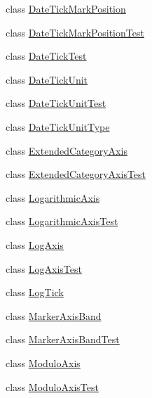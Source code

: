 \begin{DoxyCompactItemize}
\item 
class \mbox{\hyperlink{classorg_1_1jfree_1_1chart_1_1axis_1_1_date_tick_mark_position}{Date\+Tick\+Mark\+Position}}
\item 
class \mbox{\hyperlink{classorg_1_1jfree_1_1chart_1_1axis_1_1_date_tick_mark_position_test}{Date\+Tick\+Mark\+Position\+Test}}
\item 
class \mbox{\hyperlink{classorg_1_1jfree_1_1chart_1_1axis_1_1_date_tick_test}{Date\+Tick\+Test}}
\item 
class \mbox{\hyperlink{classorg_1_1jfree_1_1chart_1_1axis_1_1_date_tick_unit}{Date\+Tick\+Unit}}
\item 
class \mbox{\hyperlink{classorg_1_1jfree_1_1chart_1_1axis_1_1_date_tick_unit_test}{Date\+Tick\+Unit\+Test}}
\item 
class \mbox{\hyperlink{classorg_1_1jfree_1_1chart_1_1axis_1_1_date_tick_unit_type}{Date\+Tick\+Unit\+Type}}
\item 
class \mbox{\hyperlink{classorg_1_1jfree_1_1chart_1_1axis_1_1_extended_category_axis}{Extended\+Category\+Axis}}
\item 
class \mbox{\hyperlink{classorg_1_1jfree_1_1chart_1_1axis_1_1_extended_category_axis_test}{Extended\+Category\+Axis\+Test}}
\item 
class \mbox{\hyperlink{classorg_1_1jfree_1_1chart_1_1axis_1_1_logarithmic_axis}{Logarithmic\+Axis}}
\item 
class \mbox{\hyperlink{classorg_1_1jfree_1_1chart_1_1axis_1_1_logarithmic_axis_test}{Logarithmic\+Axis\+Test}}
\item 
class \mbox{\hyperlink{classorg_1_1jfree_1_1chart_1_1axis_1_1_log_axis}{Log\+Axis}}
\item 
class \mbox{\hyperlink{classorg_1_1jfree_1_1chart_1_1axis_1_1_log_axis_test}{Log\+Axis\+Test}}
\item 
class \mbox{\hyperlink{classorg_1_1jfree_1_1chart_1_1axis_1_1_log_tick}{Log\+Tick}}
\item 
class \mbox{\hyperlink{classorg_1_1jfree_1_1chart_1_1axis_1_1_marker_axis_band}{Marker\+Axis\+Band}}
\item 
class \mbox{\hyperlink{classorg_1_1jfree_1_1chart_1_1axis_1_1_marker_axis_band_test}{Marker\+Axis\+Band\+Test}}
\item 
class \mbox{\hyperlink{classorg_1_1jfree_1_1chart_1_1axis_1_1_modulo_axis}{Modulo\+Axis}}
\item 
class \mbox{\hyperlink{classorg_1_1jfree_1_1chart_1_1axis_1_1_modulo_axis_test}{Modulo\+Axis\+Test}}
\item 

\end{DoxyCompactItemize}
